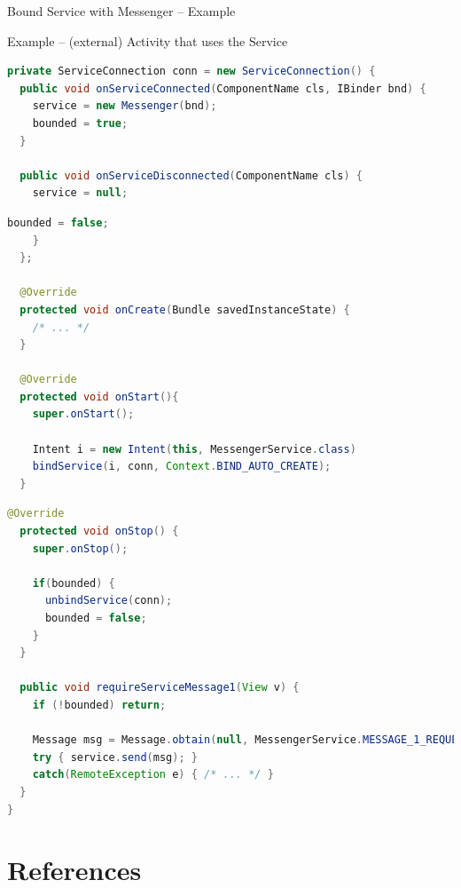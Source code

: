 \documentclass{beamer}
\begin{document}
\begin{frame}{Bound Service with Messenger -- Example}
\begin{exampleblock}{Example -- (external) Activity that uses the Service}
\begin{lstlisting}[language=Java]
private ServiceConnection conn = new ServiceConnection() {
  public void onServiceConnected(ComponentName cls, IBinder bnd) {
    service = new Messenger(bnd);
    bounded = true;
  }
  
  public void onServiceDisconnected(ComponentName cls) {
    service = null;
      \end{lstlisting}
    \end{exampleblock}  
    \begin{exampleblock}{\vspace{-10pt}}
      \begin{lstlisting}[language=Java]    
      bounded = false;
    }
  };

  @Override
  protected void onCreate(Bundle savedInstanceState) {
    /* ... */
  }

  @Override
  protected void onStart(){
    super.onStart();
    
    Intent i = new Intent(this, MessengerService.class)
    bindService(i, conn, Context.BIND_AUTO_CREATE);
  }
      \end{lstlisting}
    \end{exampleblock}  
    \begin{exampleblock}{\vspace{-10pt}}
      \begin{lstlisting}[language=Java]
  @Override
  protected void onStop() {
    super.onStop();

    if(bounded) {
      unbindService(conn);
      bounded = false;
    }
  }

  public void requireServiceMessage1(View v) {
    if (!bounded) return;
    
    Message msg = Message.obtain(null, MessengerService.MESSAGE_1_REQUEST, 0, 0); 
    try { service.send(msg); } 
    catch(RemoteException e) { /* ... */ }
  }
}    
      \end{lstlisting}
    \end{exampleblock}
  \end{frame}

\section*{References}

\end{document}
